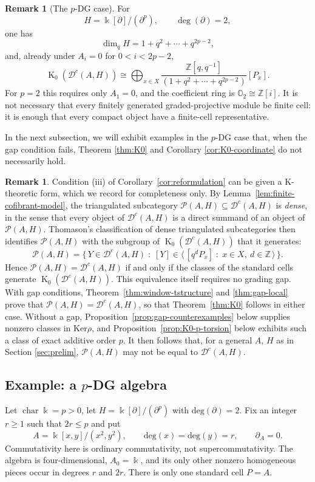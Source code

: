 \documentclass[11pt]{article}
\theoremstyle{definition}
\newtheorem{rem}[thm]{Remark}
\numberwithin{equation}{section}
\newcommand{\kk}{\Bbbk}
\newcommand{\Tcat}{\mathcal{P}(A,H)}
\newcommand{\Dc}{\mathcal{D}^c(A,H)}
\newcommand{\K}{\operatorname{K}_0}
\newcommand{\Ke}{\mathrm{Ker}}
\begin{document}
\begin{rem}[The $p$-DG case]
For
\[
H=\kk[\partial]/(\partial^p),
\qquad
\deg(\partial)=2,
\]
one has
\[
\operatorname{dim}_qH
=
1+q^2+\cdots+q^{2p-2},
\]
and, already under $A_i=0$ for $0<i<2p-2$,
\[
\K(\Dc)
\cong
\bigoplus_{x\in X}
\frac{\mathbb Z[q,q^{-1}]}
{(1+q^2+\cdots+q^{2p-2})}[P_x].
\]
For $p=2$ this requires only $A_1=0$, and the coefficient ring is
$\mathbb O_2\cong\mathbb Z[i]$.  It is not necessary that every
finitely generated graded-projective module be finite cell: it is
enough that every compact object have a finite-cell representative.

In the next subsection, we will exhibit examples in the $p$-DG case that, when the gap condition fails, Theorem \ref{thm:K0} and Corollary \ref{cor:K0-coordinate} do not necessarily hold.
\end{rem}


\begin{rem}\label{rem:thomason}
Condition (iii) of Corollary~\ref{cor:reformulation} can be given a
$\mathrm{K}$-theoretic form, which we record for completeness only.  By Lemma~\ref{lem:finite-cofibrant-model}, the triangulated subcategory
$\Tcat\subseteq\Dc$ is \emph{dense}, in the sense that every object of $\Dc$ is
a direct summand of an object of $\Tcat$.  Thomason's classification of dense
triangulated subcategories \cite{Thomason} then identifies $\Tcat$ with the
subgroup of $\K(\Dc)$ that it generates:
\[
\Tcat=\bigl\{\,Y\in\Dc \;:\; [Y]\in\langle\, [q^dP_x] \;:\; x\in X,\ d\in\mathbb Z \,\rangle \,\bigr\}.
\]
Hence $\Tcat=\Dc$ if and only if the classes of the standard cells generate
$\K(\Dc)$.  This equivalence itself requires no grading gap.
With gap conditions,
Theorem~\ref{thm:window-tstructure} and \ref{thm:gap-local} prove that $\Tcat=\Dc$, so that Theorem~\ref{thm:K0} follows in either case.  Without a gap,
Proposition~\ref{prop:gap-counterexamples} below supplies nonzero classes in
$\Ke\rho$, and Proposition~\ref{prop:K0-p-torsion} below exhibits
such a class of exact additive order $p$. It then follows that, for a general $A$, $H$ as in Section \ref{sec:prelim}, $\Tcat$ may not be equal to $\Dc$.
\end{rem}


\subsection{Example: a \texorpdfstring{$p$}{p}-DG algebra}
\label{sec:gap-examples}
Let $\operatorname{char}\kk=p>0$, let
$H=\kk[\partial]/(\partial^p)$ with $\mathrm{deg}(\partial)=2$.  Fix an integer $r\ge1$ such that $2r\le p$ and put
\begin{equation}\label{eq:gap-Ar}
 A=\kk[x,y]/(x^2,y^2),\qquad \mathrm{deg}(x)=\mathrm{deg}(y)=r,\qquad
 \partial_{A}=0.
\end{equation}
Commutativity here is ordinary commutativity, not supercommutativity.
The algebra is four-dimensional, $A_0=\kk$, and its only other
nonzero homogeneous pieces occur in degrees $r$ and $2r$.
There is only one standard cell $P=A$.
\end{document}

